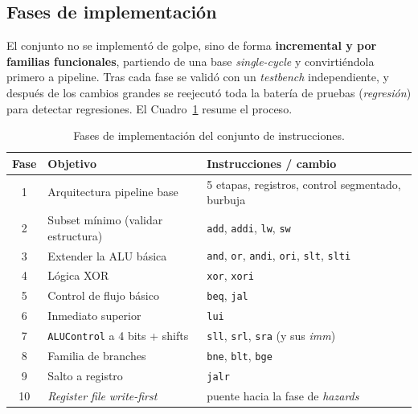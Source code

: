 \documentclass[11pt,a4paper]{article}
\begin{document}
\subsection{Fases de implementación}

El conjunto no se implementó de golpe, sino de forma \textbf{incremental y por
	familias funcionales}, partiendo de una base \textit{single-cycle} y convirtiéndola
primero a pipeline. Tras cada fase se validó con un \textit{testbench} independiente, y
después de los cambios grandes se reejecutó toda la batería de pruebas
(\textit{regresión}) para detectar regresiones. El Cuadro~\ref{cuadro:fases} resume el
proceso.

\begin{table}[ht]
	\centering
	\begin{tabular}{@{}cll@{}}
		\toprule
		\textbf{Fase} & \textbf{Objetivo}                           & \textbf{Instrucciones / cambio}                                                     \\
		\midrule
		1             & Arquitectura pipeline base                  & 5 etapas, registros, control segmentado, burbuja                                    \\
		2             & Subset mínimo (validar estructura)          & \texttt{add}, \texttt{addi}, \texttt{lw}, \texttt{sw}                               \\
		3             & Extender la ALU básica                      & \texttt{and}, \texttt{or}, \texttt{andi}, \texttt{ori}, \texttt{slt}, \texttt{slti} \\
		4             & Lógica XOR                                  & \texttt{xor}, \texttt{xori}                                                         \\
		5             & Control de flujo básico                     & \texttt{beq}, \texttt{jal}                                                          \\
		6             & Inmediato superior                          & \texttt{lui}                                                                        \\
		7             & \texttt{ALUControl} a 4 bits + shifts       & \texttt{sll}, \texttt{srl}, \texttt{sra} (y sus \textit{imm})                       \\
		8             & Familia de branches                         & \texttt{bne}, \texttt{blt}, \texttt{bge}                                            \\
		9             & Salto a registro                            & \texttt{jalr}                                                                       \\
		10            & \textit{Register file} \textit{write-first} & puente hacia la fase de \textit{hazards}                                            \\
		\bottomrule
	\end{tabular}
	\caption{Fases de implementación del conjunto de instrucciones.}
	\label{cuadro:fases}
\end{table}
\end{document}
